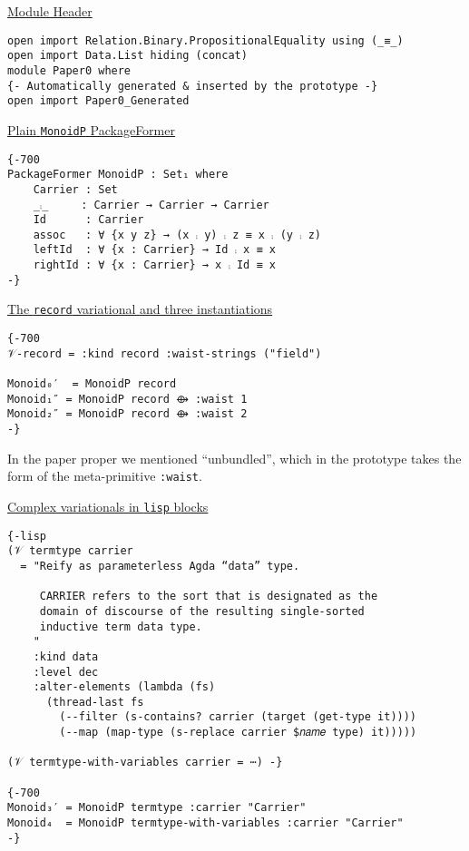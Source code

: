 \documentclass[sigplan,screen]{acmart}
\begin{document}
\vspace{0.3em}
\uline{Module Header}
\begin{footnotesize}
\begin{verbatim}
open import Relation.Binary.PropositionalEquality using (_≡_)
open import Data.List hiding (concat)
module Paper0 where
{- Automatically generated & inserted by the prototype -}
open import Paper0_Generated
\end{verbatim}

\uline{Plain \texttt{MonoidP} PackageFormer}
\begin{verbatim}
{-700
PackageFormer MonoidP : Set₁ where
    Carrier : Set
    _⨾_     : Carrier → Carrier → Carrier
    Id      : Carrier
    assoc   : ∀ {x y z} → (x ⨾ y) ⨾ z ≡ x ⨾ (y ⨾ z)
    leftId  : ∀ {x : Carrier} → Id ⨾ x ≡ x
    rightId : ∀ {x : Carrier} → x ⨾ Id ≡ x
-}
\end{verbatim}

\uline{The \texttt{record} variational and three instantiations}
\begin{verbatim}
{-700
𝒱-record = :kind record :waist-strings ("field")

Monoid₀′  = MonoidP record
Monoid₁″ = MonoidP record ⟴ :waist 1
Monoid₂″ = MonoidP record ⟴ :waist 2
-}
\end{verbatim}
In the paper proper we mentioned “unbundled”, which in the prototype
takes the form of the meta-primitive \texttt{:waist}.

\vspace{0.3em}
\uline{Complex variationals in \texttt{lisp} blocks}
\begin{small}
\begin{verbatim}
{-lisp
(𝒱 termtype carrier
  = "Reify as parameterless Agda “data” type.

     CARRIER refers to the sort that is designated as the
     domain of discourse of the resulting single-sorted
     inductive term data type.
    "
    :kind data
    :level dec
    :alter-elements (lambda (fs)
      (thread-last fs
        (--filter (s-contains? carrier (target (get-type it))))
        (--map (map-type (s-replace carrier $𝑛𝑎𝑚𝑒 type) it)))))

(𝒱 termtype-with-variables carrier = ⋯) -}

{-700
Monoid₃′ = MonoidP termtype :carrier "Carrier"
Monoid₄  = MonoidP termtype-with-variables :carrier "Carrier"
-}
\end{verbatim}
\end{small}


\end{footnotesize}
\end{document}
